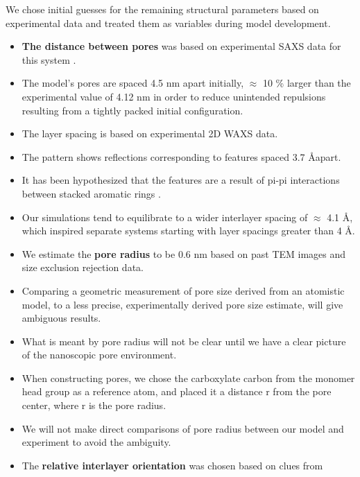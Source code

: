 \documentclass{article}
\newcommand{\angstrom}{\textup{\AA}}
\begin{document}
  We chose initial guesses for the remaining structural parameters based on 
  experimental data and treated them as variables during model development.
  \begin{itemize}
    \item \textbf{The distance between pores} was based on experimental SAXS data for
    this system \cite{feng_thin_2016}.
    \item The model's pores are spaced 4.5 nm apart initially, $\approx$ 10 \% larger
    than the experimental value of 4.12 nm in order to reduce unintended repulsions 
    resulting from a tightly packed initial configuration.
    \item The layer spacing is based on experimental 2D WAXS data.
    \item The pattern shows reflections corresponding to features spaced 3.7 \angstrom apart.
    \item It has been hypothesized that the features are a result of pi-pi
    interactions between stacked aromatic rings \cite{feng_scalable_2014}. 
    \item Our simulations tend to equilibrate to a wider interlayer spacing of
    $\approx$ 4.1 \angstrom, which inspired separate systems starting with layer 
    spacings greater than 4 \angstrom.
    \item We estimate the \textbf{pore radius} to be 0.6 nm based on past TEM images 
    and size exclusion rejection data\cite{feng_scalable_2014,feng_thin_2016,
    zhou_supported_2005}.
    \item Comparing a geometric measurement of pore size derived from an 
    atomistic model, to a less precise, experimentally derived pore size estimate,
    will give ambiguous results.
    \item What is meant by pore radius will not be clear until we have a clear picture
    of the nanoscopic pore environment.
    \item When constructing pores, we chose the carboxylate carbon from the monomer
    head group as a reference atom, and placed it a distance r from the pore center,
    where r is the pore radius.  %
    \item We will not make direct comparisons of pore radius between our model 
    and experiment to avoid the ambiguity. 
    \item The \textbf{relative interlayer orientation} was chosen based on clues from 

\end{itemize}
\end{document}
